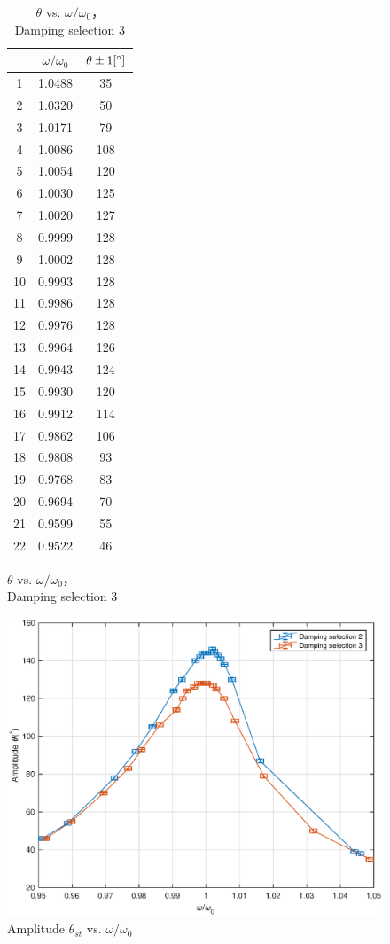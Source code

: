 \begin{figure}
\begin{minipage}{0.45\textwidth}
\begin{table}[H]
\centering
\begin{tabular}{|c|c|c|}
\hline
& $\omega/\omega_0$ &  $\theta \pm 1 [^\circ] $ \\ \hline
1  & 1.0488   & 35   \\ \hline
2  & 1.0320   & 50   \\ \hline
3  & 1.0171   & 79   \\ \hline
4  & 1.0086   & 108  \\ \hline
5  & 1.0054   & 120  \\ \hline
6  & 1.0030   & 125  \\ \hline
7  & 1.0020   & 127  \\ \hline
8  & 0.9999   & 128  \\ \hline
9  & 1.0002   & 128  \\ \hline
10 & 0.9993   & 128  \\ \hline
11 & 0.9986   & 128  \\ \hline
12 & 0.9976   & 128  \\ \hline
13 & 0.9964   & 126  \\ \hline
14 & 0.9943   & 124  \\ \hline
15 & 0.9930   & 120  \\ \hline
16 & 0.9912   & 114  \\ \hline
17 & 0.9862   & 106  \\ \hline
18 & 0.9808   & 93   \\ \hline
19 & 0.9768   & 83   \\ \hline
20 & 0.9694   & 70   \\ \hline
21 & 0.9599   & 55   \\ \hline
22 & 0.9522   & 46   \\ \hline
\end{tabular}    
\caption{$\theta$ vs. $\omega/\omega_0$，\\ Damping selection 3}\label{data_t3}
\end{table}
\end{minipage}
\vspace*{5cm}
\end{figure}

\begin{figure}[H]
\centering
\includegraphics[width=1\textwidth]{matlab/p2}
\caption{Amplitude $\theta_{st}$ vs. $\omega/\omega_0$}\label{theta}
\end{figure}